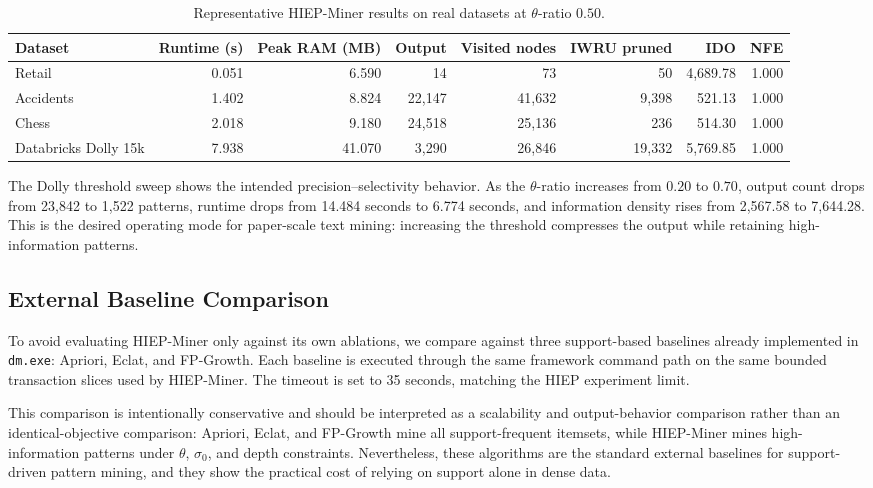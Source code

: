 \documentclass[11pt,a4paper]{article}
\begin{document}
\begin{table}[H]
\centering
\caption{Representative HIEP-Miner results on real datasets at \(\theta\)-ratio \(0.50\).}
\label{tab:hiep_real_results}
\small
\begin{adjustbox}{max width=\textwidth}
\begin{tabular}{lrrrrrrr}
\toprule
Dataset & Runtime (s) & Peak RAM (MB) & Output & Visited nodes & IWRU pruned & IDO & NFE \\
\midrule
Retail & 0.051 & 6.590 & 14 & 73 & 50 & 4,689.78 & 1.000 \\
Accidents & 1.402 & 8.824 & 22,147 & 41,632 & 9,398 & 521.13 & 1.000 \\
Chess & 2.018 & 9.180 & 24,518 & 25,136 & 236 & 514.30 & 1.000 \\
Databricks Dolly 15k & 7.938 & 41.070 & 3,290 & 26,846 & 19,332 & 5,769.85 & 1.000 \\
\bottomrule
\end{tabular}
\end{adjustbox}
\end{table}

The Dolly threshold sweep shows the intended precision--selectivity behavior. As the \(\theta\)-ratio increases from \(0.20\) to \(0.70\), output count drops from 23,842 to 1,522 patterns, runtime drops from 14.484 seconds to 6.774 seconds, and information density rises from 2,567.58 to 7,644.28. This is the desired operating mode for paper-scale text mining: increasing the threshold compresses the output while retaining high-information patterns.

\subsection{External Baseline Comparison}

To avoid evaluating HIEP-Miner only against its own ablations, we compare against three support-based baselines already implemented in \texttt{dm.exe}: Apriori, Eclat, and FP-Growth. Each baseline is executed through the same framework command path on the same bounded transaction slices used by HIEP-Miner. The timeout is set to 35 seconds, matching the HIEP experiment limit.

This comparison is intentionally conservative and should be interpreted as a scalability and output-behavior comparison rather than an identical-objective comparison: Apriori, Eclat, and FP-Growth mine all support-frequent itemsets, while HIEP-Miner mines high-information patterns under \(\theta\), \(\sigma_0\), and depth constraints. Nevertheless, these algorithms are the standard external baselines for support-driven pattern mining, and they show the practical cost of relying on support alone in dense data.
\end{document}
